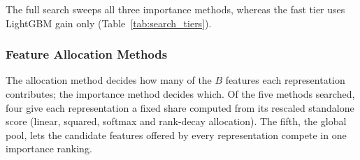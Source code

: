 
The full search sweeps all three importance methods, whereas the fast tier uses LightGBM gain only (Table~\ref{tab:search_tiers}).



\subsubsection{Feature Allocation Methods}\label{sec:method:allocation}


The allocation method decides how many of the $B$ features each representation contributes; the importance method decides which. Of the five methods searched, four give each representation a fixed share computed from its rescaled standalone score (linear, squared, softmax and rank-decay allocation). The fifth, the global pool, lets the candidate features offered by every representation compete in one importance ranking.





